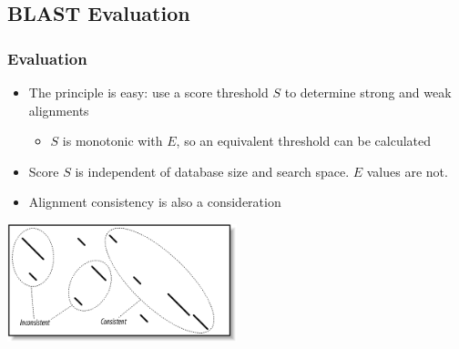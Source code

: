 %

\subsection{BLAST Evaluation}
\begin{frame}
  \frametitle{Evaluation}
  \begin{itemize}
    \item The principle is easy: use a score threshold $S$ to determine strong and weak alignments
    \begin{itemize}
      \item $S$ is monotonic with $E$, so an equivalent threshold can be calculated
    \end{itemize}
    \item Score $S$ is independent of database size and search space. $E$ values are not.
    \item Alignment consistency is also a consideration
  \end{itemize}
  \begin{center}
    \includegraphics[width=0.5\textwidth]{images/consistency} 
  \end{center}    
\end{frame}
